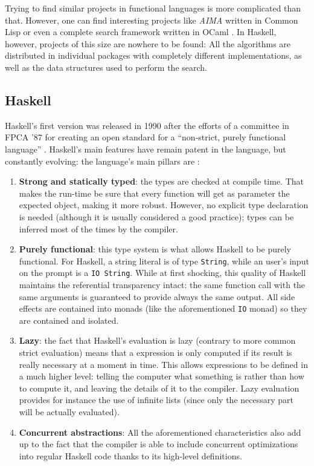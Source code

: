 Trying to find similar projects in functional languages is more complicated
than that. However, one can find interesting projects like \emph{AIMA} written
in Common Lisp \cite{lisp-aima} or even a complete search framework written in
OCaml \cite{ocaml-search}. In Haskell, however, projects of this size are
nowhere to be found: All the algorithms are distributed in individual packages
with completely different implementations, as well as the data structures used
to perform the search.


\subsection{Haskell}

Haskell's first version was released in 1990 after the efforts of a committee
in FPCA '87 for creating an open standard for a ``non-strict, purely functional
language'' \cite{haskell-history}. Haskell's main features have remain patent
in the language, but constantly evolving: the language's main pillars are
\cite{haskell-98, haskell-2010}:

\begin{enumerate}
\item \textbf{Strong and statically typed}: the types are checked at compile
  time. That makes the run-time be sure that every function will get as
  parameter the expected object, making it more robust. However, no explicit
  type declaration is needed (although it is usually considered a good
  practice); types can be inferred most of the times by the compiler.
\item \textbf{Purely functional}: this type system is what allows Haskell to be
  purely functional. For Haskell, a string literal is of type \texttt{String},
  while an user's input on the prompt is a \texttt{IO String}. While at first
  shocking, this quality of Haskell maintains the referential transparency
  intact: the same function call with the same arguments is guaranteed to
  provide always the same output. All side effects are contained into monads
  (like the aforementioned \texttt{IO} monad) so they are contained and
  isolated.
\item \textbf{Lazy}: the fact that Haskell's evaluation is lazy (contrary to
  more common strict evaluation) means that a expression is only computed if
  its result is really necessary at a moment in time. This allows expressions
  to be defined in a much higher level: telling the computer what something is
  rather than how to compute it, and leaving the details of it to the compiler.
  Lazy evaluation provides for instance the use of infinite lists (since only
  the necessary part will be actually evaluated).
\item \textbf{Concurrent abstractions}: All the aforementioned characteristics
  also add up to the fact that the compiler is able to include concurrent
  optimizations into regular Haskell code thanks to its high-level definitions.
\end{enumerate}

